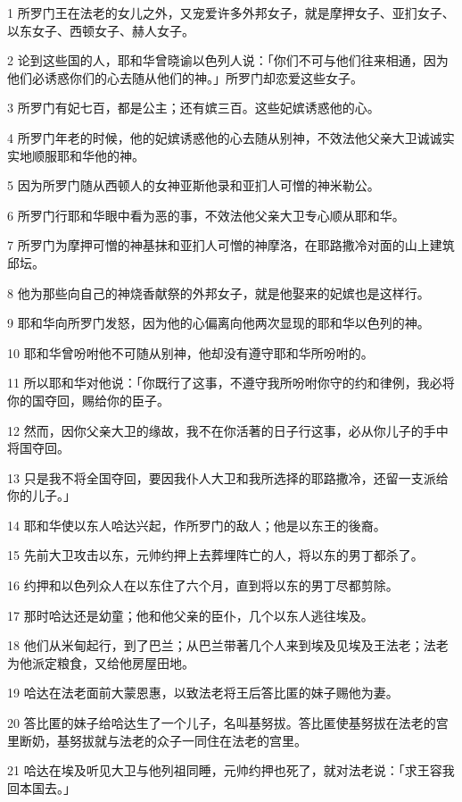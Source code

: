 \par 1 所罗门王在法老的女儿之外，又宠爱许多外邦女子，就是摩押女子、亚扪女子、以东女子、西顿女子、赫人女子。
\par 2 论到这些国的人，耶和华曾晓谕以色列人说：「你们不可与他们往来相通，因为他们必诱惑你们的心去随从他们的神。」所罗门却恋爱这些女子。
\par 3 所罗门有妃七百，都是公主；还有嫔三百。这些妃嫔诱惑他的心。
\par 4 所罗门年老的时候，他的妃嫔诱惑他的心去随从别神，不效法他父亲大卫诚诚实实地顺服耶和华他的神。
\par 5 因为所罗门随从西顿人的女神亚斯他录和亚扪人可憎的神米勒公。
\par 6 所罗门行耶和华眼中看为恶的事，不效法他父亲大卫专心顺从耶和华。
\par 7 所罗门为摩押可憎的神基抹和亚扪人可憎的神摩洛，在耶路撒冷对面的山上建筑邱坛。
\par 8 他为那些向自己的神烧香献祭的外邦女子，就是他娶来的妃嫔也是这样行。
\par 9 耶和华向所罗门发怒，因为他的心偏离向他两次显现的耶和华以色列的神。
\par 10 耶和华曾吩咐他不可随从别神，他却没有遵守耶和华所吩咐的。
\par 11 所以耶和华对他说：「你既行了这事，不遵守我所吩咐你守的约和律例，我必将你的国夺回，赐给你的臣子。
\par 12 然而，因你父亲大卫的缘故，我不在你活著的日子行这事，必从你儿子的手中将国夺回。
\par 13 只是我不将全国夺回，要因我仆人大卫和我所选择的耶路撒冷，还留一支派给你的儿子。」
\par 14 耶和华使以东人哈达兴起，作所罗门的敌人；他是以东王的後裔。
\par 15 先前大卫攻击以东，元帅约押上去葬埋阵亡的人，将以东的男丁都杀了。
\par 16 约押和以色列众人在以东住了六个月，直到将以东的男丁尽都剪除。
\par 17 那时哈达还是幼童；他和他父亲的臣仆，几个以东人逃往埃及。
\par 18 他们从米甸起行，到了巴兰；从巴兰带著几个人来到埃及见埃及王法老；法老为他派定粮食，又给他房屋田地。
\par 19 哈达在法老面前大蒙恩惠，以致法老将王后答比匿的妹子赐他为妻。
\par 20 答比匿的妹子给哈达生了一个儿子，名叫基努拔。答比匿使基努拔在法老的宫里断奶，基努拔就与法老的众子一同住在法老的宫里。
\par 21 哈达在埃及听见大卫与他列祖同睡，元帅约押也死了，就对法老说：「求王容我回本国去。」
